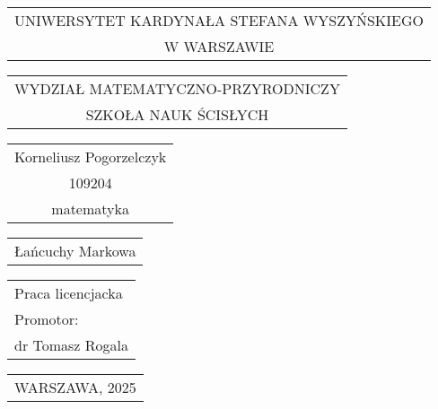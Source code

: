 \documentclass[final,a4paper,openany,12pt]{mwbk}
\begin{document}
\newtheorem{Tw}{Twierdzenie}
\newtheorem{Def}{Definicja}
\newtheorem{Prz}{Przykład}
\newtheorem{Dow}{Dowód}
\selectfont %

\begin{titlepage}
\vspace{-0.5cm}

\renewcommand{\arraystretch}{1.3} %

\begin{center}
{\footnotesize
\begin{tabular}{c}
UNIWERSYTET KARDYNAŁA STEFANA WYSZYŃSKIEGO\\
W WARSZAWIE\\
\end{tabular}
}
\vspace{2.5cm}

{\footnotesize
\begin{tabular}{c}
WYDZIAŁ MATEMATYCZNO-PRZYRODNICZY\\
SZKOŁA NAUK ŚCISŁYCH\\
\end{tabular}
}
\vspace{2.7cm}

\renewcommand{\arraystretch}{1.5} %

{\normalsize
\begin{tabular}{c}
Korneliusz Pogorzelczyk\\

109204\\

matematyka\\
\end{tabular}
}

\vspace{2.3cm}

{\large
\begin{tabular}{c}
Łańcuchy Markowa
\end{tabular}
}

\end{center}
\vspace{4cm}

\hspace{6cm}
\begin{tabular}{l}
Praca licencjacka\\

Promotor:\\

dr Tomasz Rogala
\end{tabular}

\vspace{3.5cm}

{\centering

{\small
\begin{tabular}{c}
{WARSZAWA, 2025}\\
\end{tabular}
}

}

\renewcommand{\arraystretch}{1} %

\end{titlepage}
\end{document}
